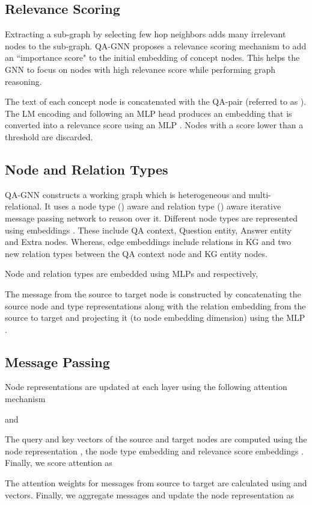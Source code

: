 \documentclass[11pt]{article}
\begin{document}
\subsection{Relevance Scoring}
\label{sec_app:relevance_scoring}
Extracting a sub-graph by selecting few hop neighbors adds many irrelevant nodes to the sub-graph.
QA-GNN proposes a relevance scoring mechanism to add an ``importance score" to the initial embedding of concept nodes. This helps the GNN to focus on nodes with high relevance score while performing graph reasoning.

The text of each concept node  is concatenated with the QA-pair (referred to as ).
The LM encoding and following an MLP head produces an embedding  that is converted into a relevance score  using an MLP .
Nodes with a score lower than a threshold are discarded.

\subsection{Node and Relation Types}
QA-GNN constructs a working graph which is heterogeneous and multi-relational.
It uses a node type () aware and relation type () aware iterative message passing network to reason over it.
Different node types are represented using embeddings . These include QA context, Question entity, Answer entity and Extra nodes. 
Whereas, edge embeddings  include relations in KG and two new relation types between the QA context node and KG entity nodes.

Node and relation types are embedded using MLPs  and  respectively,

The message from the source to target node is constructed by concatenating the source node and type representations along with the relation embedding from the source to target and projecting it (to node embedding dimension) using the MLP . 


\subsection{Message Passing}
Node representations are updated at each layer using the following attention mechanism

and


The query  and key  vectors of the source and target nodes are computed using the node representation , the node type embedding  and relevance score embeddings .
Finally, we score attention  as


The attention weights for messages from source to target  are calculated using  and  vectors.
Finally, we aggregate messages and update the node representation as
\end{document}
